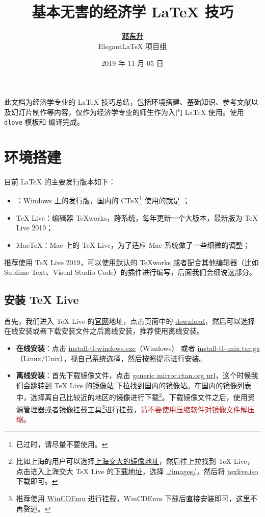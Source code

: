 \documentclass[11pt,a4paper]{dlove}
\title{\bfseries 基本无害的经济学 \LaTeX{} 技巧}
\author{\href{https://ddswhu.me/}{\bfseries 邓东升} \\  Elegant\LaTeX{} 项目组}
\date{2019 年 11 月 05 日}
\newcommand{\texmint}[1]{\texttt{#1}}
\begin{document}
\maketitle

此文档为经济学专业的 \LaTeX{} 技巧总结，包括环境搭建、基础知识、参考文献以及幻灯片制作等内容，仅作为经济学专业的师生作为入门 \LaTeX{} 使用。使用 \texmint{dlove} \heart{} 模板和  编译完成。

\section{环境搭建}
目前 \LaTeX{} 的主要发行版本如下：
\begin{itemize}
  \item {}：Windows 上的发行版，国内的 C\TeX{}\footnote{已过时，请尽量不要使用。} 使用的就是 ；
  \item \TeX{} Live：编辑器 \TeX{}works，跨系统，每年更新一个大版本，最新版为 TeX Live 2019；
  \item Mac\TeX{}：Mac 上的 \TeX{} Live，为了适应 Mac 系统做了一些细微的调整；
\end{itemize} 

推荐使用 \TeX{} Live 2019，可以使用默认的 \TeX{}works 或者配合其他编辑器（比如 Sublime Text、Visual Studio Code）的插件进行编写，后面我们会细说这部分。

\subsection{安装 \TeX{} Live}
首先，我们进入 \TeX{} Live 的\href{https://www.tug.org/texlive/}{官网}地址，点击页面中的 \href{https://www.tug.org/texlive/acquire-netinstall.html}{download}，然后可以选择在线安装或者下载安装文件之后离线安装，推荐使用离线安装。
\begin{itemize}
  \item \textbf{在线安装}：点击 \href{http://mirror.ctan.org/systems/texlive/tlnet/install-tl-windows.exe}{install-tl-windows.exe}（Windows） 或者 \href{http://mirror.ctan.org/systems/texlive/tlnet/install-tl-unx.tar.gz}{install-tl-unix.tar.gz}（Linux/Unix），视自己系统选择，然后按照提示进行安装。
  \item \textbf{离线安装}：首先下载镜像文件，点击 \href{https://ctan.org/mirrors}{generic mirror.ctan.org url}，这个时候我们会跳转到 \TeX{} Live 的\href{https://ctan.org/mirrors}{镜像站},下拉找到国内的镜像站。在国内的镜像列表中，选择离自己比较近的地区的镜像进行下载\footnote{比如上海的用户可以选择\href{https://mirrors.sjtug.sjtu.edu.cn/ctan/}{上海交大的镜像地址}，然后往上拉找到 \TeX{} Live，点击进入上海交大 \TeX{} Live 的\href{https://mirrors.sjtug.sjtu.edu.cn/ctan/systems/texlive/}{下载地址}，选择 \href{https://mirrors.sjtug.sjtu.edu.cn/ctan/systems/texlive/Images/}{./images/}，然后将 \href{https://mirrors.sjtug.sjtu.edu.cn/ctan/systems/texlive/Images/texlive.iso}{texlive.iso}下载即可。}。下载镜像文件之后，使用资源管理器或者镜像挂载工具\footnote{推荐使用 \href{http://wincdemu.sysprogs.org/}{WinCDEmu} 进行挂载，WinCDEmu 下载后直接安装即可，这里不再赘述。}进行挂载，\textsf{\textcolor{FireBrick}{请不要使用压缩软件对镜像文件解压缩}}。
\end{itemize}
\end{document}
